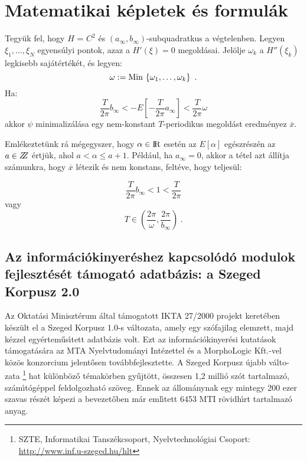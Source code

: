 \documentclass{llncs}
\begin{document}
\section{Matematikai k\'epletek \'es formul\'ak}

\begin{theorem}
Tegy\"uk fel, hogy $H$ = $C^{2}$ \'es
$\left(a_{\infty},b_{\infty}\right)$-subquadratkus a v\'egtelenben. Legyen
$\xi_{1},\allowbreak\dots,\allowbreak\xi_{N}$  egyens\'ulyi pontok,
azaz a $H' (\xi ) = 0$ megold\'asai.
Jel\"olje $\omega_{k}$ a $H'' \left(\xi_{k}\right)$ legkisebb saj\'at\'ert\'ek\'et,
\'es legyen:
\begin{equation}
  \omega : = {\rm Min\,} \left\{\omega_{1},\dots,\omega_{k}\right\}\ .
\end{equation}
Ha:
\begin{equation}
  \frac{T}{2\pi} b_{\infty} <
  - E \left[- \frac{T}{2\pi}a_{\infty}\right] <
  \frac{T}{2\pi}\omega
  \label{eq:three}
\end{equation}
akkor $\psi$ minimaliz\'al\'asa egy nem-konstant $T$-periodikus megold\'ast eredm\'enyez
$\overline{x}$.
\end{theorem}
%

Eml\'ekeztet\"unk r\'a m\'egegyszer, hogy $\alpha \in {\rm I\!R}$ eset\'en az $E [\alpha ]$ 
eg\'eszr\'esz\'en az $a\in \bbbz$ \'ertj\"uk, ahol $a< \alpha \le a+1$. P\'eld\'aul,
ha $a_{\infty} = 0$, akkor a t\'etel azt \'all\'itja sz\'amunkra, hogy $\overline{x}$
l\'etezik \'es nem konstans, felt\'eve, hogy teljes\"ul:

\begin{equation}
  \frac{T}{2\pi} b_{\infty} < 1 < \frac{T}{2\pi}
\end{equation}
vagy
\begin{equation}
  T\in \left(\frac{2\pi}{\omega},\frac{2\pi}{b_{\infty}}\right)\ .
  \label{eq:four}
\end{equation}

\subsection{Az inform\'aci\'okinyer\'eshez kapcsol\'od\'o modulok fejleszt\'es\'et 
t\'amogat\'o adatb\'azis: a Szeged Korpusz 2.0}

Az Oktat\'asi Miniszt\'erum \'altal t\'amogatott IKTA 27/2000 projekt
keret\'eben k\'esz\"ult el a Szeged Korpusz 1.0-s v\'altozata\cite{alexin:eacl2003},
amely egy sz\'ofajilag elemzett,
majd k\'ezzel egy\'ertem\H{u}s\'\i tett adatb\'azis volt. Ezt az inform\'aci\'okinyer\'esi
kutat\'asok t\'amogat\'as\'ara az MTA Nyelvtudom\'anyi Int\'ezettel \'es a
MorphoLogic Kft.-vel k\"oz\"os konzorcium jelent\H{o}sen tov\'abbfejlesztette.
A Szeged Korpusz \'ujabb v\'alto- zata
\footnote{SZTE, Informatikai Tansz\'ekcsoport, Nyelvtechnol\'ogiai
Csoport: \url{http://www.inf.u-szeged.hu/hlt}}
hat k\"ul\"onb\"oz\H{o} t\'emak\"orben
gy\H{u}jt\"ott, \"osszesen 1,2 milli\'o sz\'ot tartalmaz\'o, sz\'am\'\i t\'og\'eppel
feldolgozhat\'o sz\"oveg. Ennek az \'allom\'anynak egy mintegy 200 ezer szavas
r\'esz\'et k\'epezi a bevezet\H{o}ben m\'ar eml\'\i tett 6453 MTI r\"ovidh\'\i rt
tartalmaz\'o anyag.
\end{document}
